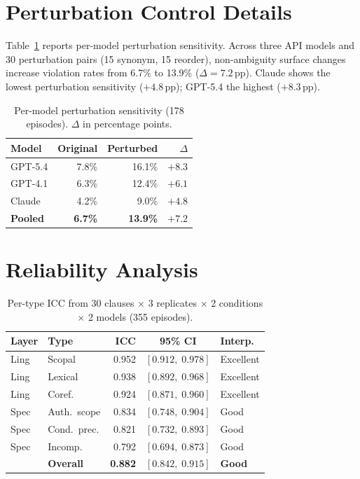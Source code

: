 \documentclass[11pt,twocolumn]{article}
\newcommand{\pp}{\,\text{pp}}
\newcommand{\CI}[2]{[#1,\;#2]}
\begin{document}
\appendix
\section{Perturbation Control Details}
\label{app:perturbation}

Table~\ref{tab:perturbation_detail} reports per-model perturbation sensitivity.
Across three API models and 30 perturbation pairs (15 synonym, 15 reorder), non-ambiguity surface changes increase violation rates from 6.7\% to 13.9\% ($\Delta=7.2\pp$).
Claude shows the lowest perturbation sensitivity ($+4.8\pp$); GPT-5.4 the highest ($+8.3\pp$).

\begin{table}[h]
\centering
\small
\begin{tabular}{@{}lrrr@{}}
\toprule
\textbf{Model} & \textbf{Original} & \textbf{Perturbed} & \textbf{$\Delta$} \\
\midrule
GPT-5.4 & 7.8\% & 16.1\% & $+8.3$ \\
GPT-4.1 & 6.3\% & 12.4\% & $+6.1$ \\
Claude & 4.2\% & 9.0\% & $+4.8$ \\
\midrule
\textbf{Pooled} & \textbf{6.7\%} & \textbf{13.9\%} & $\mathbf{+7.2}$ \\
\bottomrule
\end{tabular}
\caption{Per-model perturbation sensitivity (178 episodes). $\Delta$ in percentage points.}
\label{tab:perturbation_detail}
\end{table}

\section{Reliability Analysis}
\label{app:reliability}

\begin{table}[h]
\centering
\small
\begin{tabular}{@{}llrcl@{}}
\toprule
\textbf{Layer} & \textbf{Type} & \textbf{ICC} & \textbf{95\% CI} & \textbf{Interp.} \\
\midrule
Ling & Scopal & 0.952 & $\CI{0.912}{0.978}$ & Excellent \\
Ling & Lexical & 0.938 & $\CI{0.892}{0.968}$ & Excellent \\
Ling & Coref. & 0.924 & $\CI{0.871}{0.960}$ & Excellent \\
Spec & Auth.\ scope & 0.834 & $\CI{0.748}{0.904}$ & Good \\
Spec & Cond.\ prec. & 0.821 & $\CI{0.732}{0.893}$ & Good \\
Spec & Incomp. & 0.792 & $\CI{0.694}{0.873}$ & Good \\
\midrule
& \textbf{Overall} & \textbf{0.882} & $\CI{0.842}{0.915}$ & \textbf{Good} \\
\bottomrule
\end{tabular}
\caption{Per-type ICC from 30 clauses $\times$ 3 replicates $\times$ 2 conditions $\times$ 2 models (355 episodes).}
\label{tab:icc}
\end{table}
\end{document}
